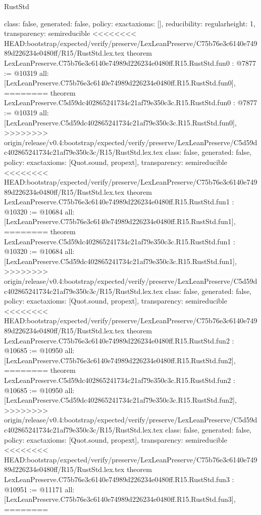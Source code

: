 \begin{lexlean}{RustStd}
\begin{coremodule}
{\begin{coremodule}
{{{  class: false,
  generated: false,
  policy: exact{axioms: []},
  reducibility: regular{height: 1},
  transparency: semireducible
}
<<<<<<<< HEAD:bootstrap/expected/verify/preserve/LexLeanPreserve/C75b76e3c6140e74989d226234e0480ff/R15/RustStd.lex.tex
theorem LexLeanPreserve.C75b76e3c6140e74989d226234e0480ff.R15.RustStd.fun0 : @7877 := @10319 {
  all: [LexLeanPreserve.C75b76e3c6140e74989d226234e0480ff.R15.RustStd.fun0],
========
theorem LexLeanPreserve.C5d59dc402865241734c21af79e350c3c.R15.RustStd.fun0 : @7877 := @10319 {
  all: [LexLeanPreserve.C5d59dc402865241734c21af79e350c3c.R15.RustStd.fun0],
>>>>>>>> origin/release/v0.4:bootstrap/expected/verify/preserve/LexLeanPreserve/C5d59dc402865241734c21af79e350c3c/R15/RustStd.lex.tex
  class: false,
  generated: false,
  policy: exact{axioms: [Quot.sound, propext]},
  transparency: semireducible
}
<<<<<<<< HEAD:bootstrap/expected/verify/preserve/LexLeanPreserve/C75b76e3c6140e74989d226234e0480ff/R15/RustStd.lex.tex
theorem LexLeanPreserve.C75b76e3c6140e74989d226234e0480ff.R15.RustStd.fun1 : @10320 := @10684 {
  all: [LexLeanPreserve.C75b76e3c6140e74989d226234e0480ff.R15.RustStd.fun1],
========
theorem LexLeanPreserve.C5d59dc402865241734c21af79e350c3c.R15.RustStd.fun1 : @10320 := @10684 {
  all: [LexLeanPreserve.C5d59dc402865241734c21af79e350c3c.R15.RustStd.fun1],
>>>>>>>> origin/release/v0.4:bootstrap/expected/verify/preserve/LexLeanPreserve/C5d59dc402865241734c21af79e350c3c/R15/RustStd.lex.tex
  class: false,
  generated: false,
  policy: exact{axioms: [Quot.sound, propext]},
  transparency: semireducible
}
<<<<<<<< HEAD:bootstrap/expected/verify/preserve/LexLeanPreserve/C75b76e3c6140e74989d226234e0480ff/R15/RustStd.lex.tex
theorem LexLeanPreserve.C75b76e3c6140e74989d226234e0480ff.R15.RustStd.fun2 : @10685 := @10950 {
  all: [LexLeanPreserve.C75b76e3c6140e74989d226234e0480ff.R15.RustStd.fun2],
========
theorem LexLeanPreserve.C5d59dc402865241734c21af79e350c3c.R15.RustStd.fun2 : @10685 := @10950 {
  all: [LexLeanPreserve.C5d59dc402865241734c21af79e350c3c.R15.RustStd.fun2],
>>>>>>>> origin/release/v0.4:bootstrap/expected/verify/preserve/LexLeanPreserve/C5d59dc402865241734c21af79e350c3c/R15/RustStd.lex.tex
  class: false,
  generated: false,
  policy: exact{axioms: [Quot.sound, propext]},
  transparency: semireducible
}
<<<<<<<< HEAD:bootstrap/expected/verify/preserve/LexLeanPreserve/C75b76e3c6140e74989d226234e0480ff/R15/RustStd.lex.tex
theorem LexLeanPreserve.C75b76e3c6140e74989d226234e0480ff.R15.RustStd.fun3 : @10951 := @11171 {
  all: [LexLeanPreserve.C75b76e3c6140e74989d226234e0480ff.R15.RustStd.fun3],
========
}}}}}}
\end{coremodule}}
\end{coremodule}
\end{lexlean}
